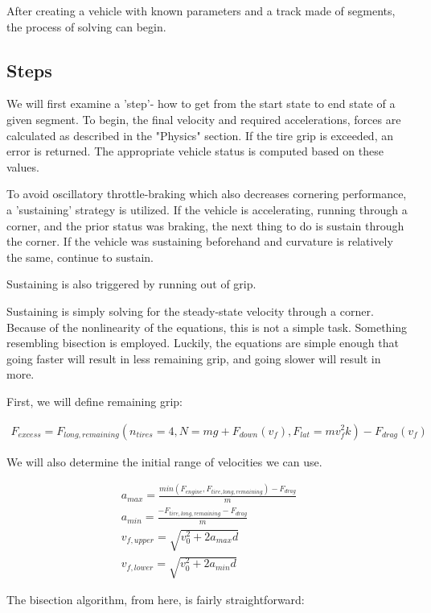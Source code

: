 \documentclass{article}
\begin{document}
After creating a vehicle with known parameters and a track made of segments, the process of solving can begin. 

\subsection{Steps}

We will first examine a 'step'- how to get from the start state to end state of a given segment. To begin, the final velocity and required accelerations, forces are calculated as described in the "Physics" section. If the tire grip is exceeded, an error is returned. The appropriate vehicle status is computed based on these values.

To avoid oscillatory throttle-braking which also decreases cornering performance, a 'sustaining' strategy is utilized. If the vehicle is accelerating, running through a corner, and the prior status was braking, the next thing to do is sustain through the corner. If the vehicle was sustaining beforehand and curvature is relatively the same, continue to sustain.

Sustaining is also triggered by running out of grip.

Sustaining is simply solving for the steady-state velocity through a corner. Because of the nonlinearity of the equations, this is not a simple task. Something resembling bisection is employed. Luckily, the equations are simple enough that going faster will result in less remaining grip, and going slower will result in more.

First, we will define remaining grip:

\begin{align}
	F_{excess} = F_{long,remaining}(n_{tires} = 4, N = m g + F_{down}(v_f), F_{lat} = m v_f^2 k) - F_{drag}(v_f)
\end{align}

We will also determine the initial range of velocities we can use.

\begin{align}
	a_{max} = \frac{min(F_{engine},F_{tire,long,remaining})-F_{drag}}{m} \\
	a_{min} = \frac{-F_{tire,long,remaining}-F_{drag}}{m} \\
	v_{f,upper} = \sqrt{v_0^2 + 2 a_{max} d} \\
	v_{f,lower} = \sqrt{v_0^2 + 2 a_{min} d}
\end{align}

The bisection algorithm, from here, is fairly straightforward:
\end{document}

